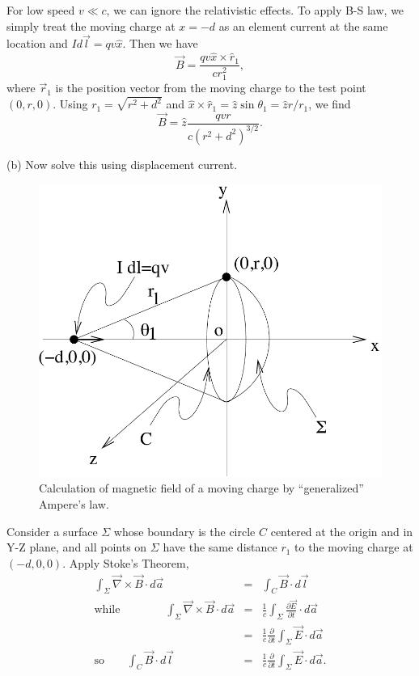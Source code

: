 \documentclass[solutions]{esg8022pset}
\begin{document}
For low speed $v\ll c$, we can ignore the relativistic effects.  To
apply B-S law, we simply treat the moving charge at $x=-d$ as an
element current at the same location and $I d\vec{l}=qv\hat{x}$.  Then
we have
\begin{equation}
\vec{B}= \frac{qv\hat{x}\times\hat{r}_1}{cr_1^2},
\end{equation}
where $\vec{r}_1$ is the position vector from the moving charge to the
test point $(0,r,0)$.  Using $r_1 = \sqrt{r^2 + d^2}$ and $\hat
x\times\hat r_1 = \hat z\sin\theta_1 = \hat z r/r_1$, we find
\begin{equation}
\vec{B}= \hat{z}\frac{qvr}{c(r^2+d^2)^{3/2}}.
\end{equation}

(b) Now solve this using displacement current.\\

 \begin{figure}[H]
    \centering
    \includegraphics[width = 15cm]{m6}
    \caption{Calculation of magnetic field of a moving charge by
``generalized'' Ampere's law.}
  \end{figure}

Consider a surface $\Sigma$ whose boundary is the circle $C$ centered
at the origin and in Y-Z plane, and all points on $\Sigma$ have the
same distance $r_1$ to the moving charge at $(-d,0,0)$.  Apply Stoke's
Theorem,
\begin{eqnarray}
\int_{\Sigma} \vec{\nabla}\times\vec{B}\cdot d\vec{a} &=& \int_C
\vec{B}\cdot d\vec{l}\\
\textrm{while} \qquad\qquad \int_{\Sigma} \vec{\nabla}\times\vec{B}\cdot
d\vec{a} &=& \frac{1}{c}\int_{\Sigma} \frac{\partial \vec{E}}{\partial
t}\cdot d\vec{a}\nonumber\\
&=& \frac{1}{c}\frac{\partial}{\partial t}\int_{\Sigma} \vec{E}\cdot
d\vec{a}\\
\textrm{so}\qquad \int_C \vec{B}\cdot d\vec{l} &=&
\frac{1}{c}\frac{\partial}{\partial t}\int_{\Sigma} \vec{E}\cdot
d\vec{a}.
\end{eqnarray}
\end{document}
